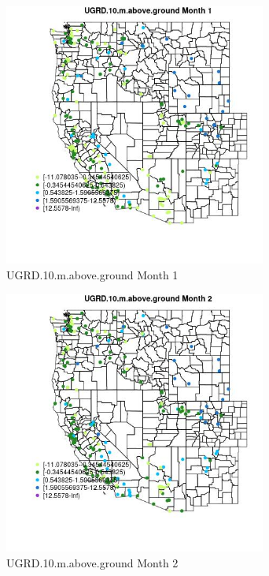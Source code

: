 \begin{figure} 
\centering  
\includegraphics[width=0.77\textwidth]{Code_Outputs/Report_ML_input_PM25_Step4_part_e_de_duplicated_aveswNAs_MapObsMo1UGRD10maboveground.jpg} 
\caption{\label{fig:Report_ML_input_PM25_Step4_part_e_de_duplicated_aveswNAsMapObsMo1UGRD10maboveground}UGRD.10.m.above.ground Month 1} 
\end{figure} 
 

\begin{figure} 
\centering  
\includegraphics[width=0.77\textwidth]{Code_Outputs/Report_ML_input_PM25_Step4_part_e_de_duplicated_aveswNAs_MapObsMo2UGRD10maboveground.jpg} 
\caption{\label{fig:Report_ML_input_PM25_Step4_part_e_de_duplicated_aveswNAsMapObsMo2UGRD10maboveground}UGRD.10.m.above.ground Month 2} 
\end{figure} 
 

